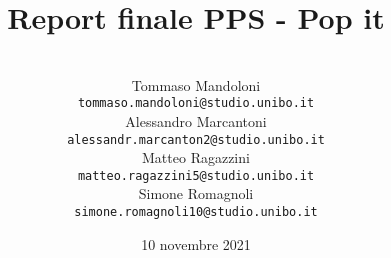 \title{\textbf{Report finale PPS - Pop it}}
\author{
    \\Tommaso Mandoloni
    \\\texttt{tommaso.mandoloni@studio.unibo.it}
    \\Alessandro Marcantoni
    \\\texttt{alessandr.marcanton2@studio.unibo.it}
    \\Matteo Ragazzini
    \\\texttt{matteo.ragazzini5@studio.unibo.it}
    \\Simone Romagnoli
    \\\texttt{simone.romagnoli10@studio.unibo.it}
}
\date{10 novembre 2021}
